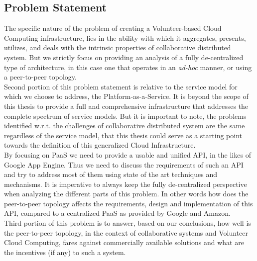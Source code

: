 \documentclass[11pt]{amsart}
\begin{document}
        \subsection{Problem Statement}
        The specific nature of the problem of creating a Volunteer-based Cloud
        Computing infrastructure, lies in the ability with which it aggregates,
        presents, utilizes, and deals with the intrinsic properties of
        collaborative distributed system. But we strictly focus on providing an
        analysis of a fully de-centralized type of architecture, in this case
        one that operates in an \emph{ad-hoc} manner, or using a peer-to-peer
        topology.  \\ Second portion of this problem statement is relative to
        the service model for which we choose to address, the
        Platform-as-a-Service. It is beyond the scope of this thesis to provide
        a full and comprehensive infrastructure that addresses the complete
        spectrum of service models. But it is important to note, the problems
        identified w.r.t. the challenges of collaborative distributed system are
        the same regardless of the service model, that this thesis could serve
        as a starting point towards the definition of this generalized Cloud
        Infrastructure. \\ By focusing on PaaS we need to provide a usable and
        unified API, in the likes of Google App Engine. Thus we need to discuss
        the requirements of such an API and try to address most of them using
        state of the art techniques and mechanisms. It is imperative to always
        keep the fully de-centralized perspective when analyzing the different
        parts of this problem. In other words how does the peer-to-peer topology
        affects the requirements, design and implementation of this API, compared to a
        centralized PaaS as provided by Google and Amazon. \\ Third portion of
        this problem is to answer, based on our conclusions, how well is the
        peer-to-peer topology, in the context of collaborative systems and
        Volunteer Cloud Computing, fares against commercially available
        solutions and what are the incentives (if any) to such a system.
\end{document}
